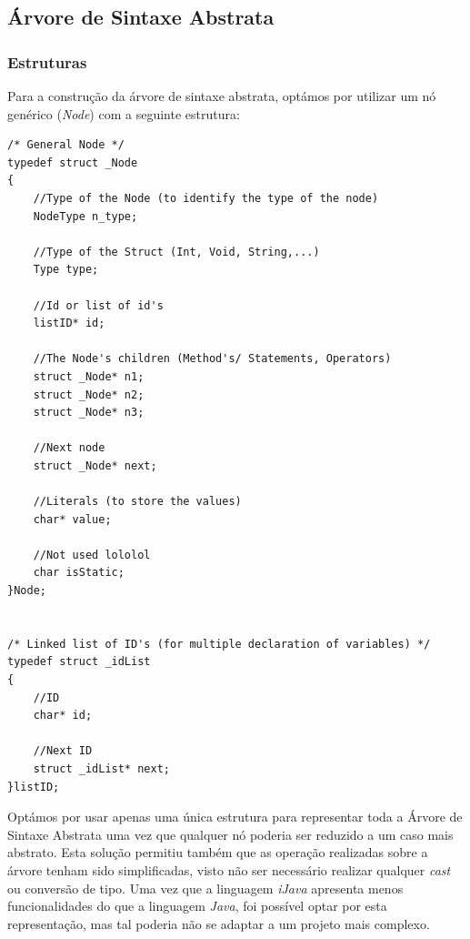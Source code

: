 \documentclass[12pt]{article}
\begin{document}
\pagebreak
\subsection{Árvore de Sintaxe Abstrata}

\subsubsection{Estruturas}
Para a construção da árvore de sintaxe abstrata, optámos por utilizar um nó genérico (\emph{Node}) com a  seguinte estrutura: 

\begin{lstlisting}
/* General Node */
typedef struct _Node
{
    //Type of the Node (to identify the type of the node)
    NodeType n_type;

    //Type of the Struct (Int, Void, String,...)
    Type type;

    //Id or list of id's
    listID* id;

    //The Node's children (Method's/ Statements, Operators)
    struct _Node* n1;
    struct _Node* n2;
    struct _Node* n3;

    //Next node
    struct _Node* next;

    //Literals (to store the values)
    char* value;
	
	//Not used lololol
    char isStatic;
}Node;


/* Linked list of ID's (for multiple declaration of variables) */
typedef struct _idList
{
	//ID
	char* id;
	
	//Next ID
	struct _idList* next;
}listID;

\end{lstlisting}

Optámos por usar apenas uma única estrutura para representar toda a Árvore de Sintaxe Abstrata uma vez que qualquer nó poderia ser reduzido a um caso mais abstrato. Esta solução permitiu também que as operação realizadas sobre a árvore tenham sido simplificadas, visto não ser necessário realizar qualquer \emph{cast} ou conversão de tipo. Uma vez que a linguagem \emph{iJava} apresenta menos funcionalidades do que a linguagem \emph{Java}, foi possível optar por esta representação, mas tal poderia não se adaptar a um projeto mais complexo.
\end{document}
